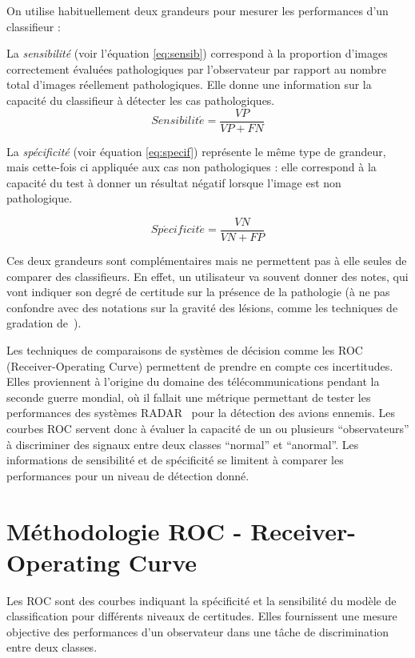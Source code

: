 On utilise habituellement deux grandeurs pour mesurer les performances d'un classifieur :

La \emph{sensibilité} (voir l'équation \ref{eq:sensib}) correspond à la proportion d'images correctement évaluées pathologiques par l'observateur par rapport au nombre total d'images réellement pathologiques. Elle donne une information sur la capacité du classifieur à détecter les cas pathologiques.
\label{lab:pressensib}
\begin{equation}
	\label{eq:sensib}
	Sensibilit\acute{e} = \frac{VP}{VP + FN}
\end{equation}

La \emph{spécificité} (voir équation \ref{eq:specif}) représente le même type de grandeur, mais cette-fois ci appliquée aux cas non pathologiques : elle correspond à la capacité du test à donner un résultat négatif lorsque l'image est non pathologique.

\begin{equation}
	\label{eq:specif}
	Sp\acute{e}cificit\acute{e} = \frac{VN}{VN + FP}
\end{equation}

Ces deux grandeurs sont complémentaires mais ne permettent pas à elle seules de comparer des classifieurs. En effet, un  utilisateur va souvent donner des notes, qui vont indiquer son degré de certitude sur la présence de la pathologie (à ne pas confondre avec des notations sur la gravité des lésions, comme les techniques de gradation de~\cite{genestie1998comparison}).

Les techniques de comparaisons de systèmes de décision comme les ROC (Receiver-Operating Curve) permettent de prendre en compte ces incertitudes. Elles proviennent à l'origine du domaine des télécommunications pendant la seconde guerre mondial, où il fallait une métrique permettant de tester les performances des systèmes RADAR~\cite{zou2007receiver} pour la détection des avions ennemis. Les courbes ROC servent donc à évaluer la capacité de un ou plusieurs ``observateurs'' à discriminer des signaux entre deux classes ``normal'' et ``anormal''. Les informations de sensibilité et de spécificité se limitent à comparer les performances pour un niveau de détection donné.


	\section{Méthodologie ROC - Receiver-Operating Curve}

Les ROC \cite{swets1982evaluation}\cite{metz1986roc} sont des courbes indiquant la spécificité et la sensibilité du modèle de classification pour différents niveaux de certitudes. Elles fournissent une mesure objective des performances d'un observateur dans une tâche de discrimination entre deux classes. 

